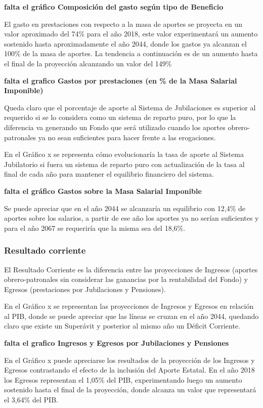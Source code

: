 \documentclass[a4paper,11pt]{article}
\begin{document}
\textbf{falta el gráfico Composición del gasto según tipo de Beneficio}

El gasto en prestaciones con respecto a la masa de aportes se proyecta en un valor aproximado del 74\% para el año 2018, este valor experimentará un aumento sostenido hasta aproximadamente el año 2044, donde los gastos ya alcanzan el 100\% de la masa de aportes.  La tendencia a continuación es de un aumento hasta el final de la proyección alcanzando un valor del 149\%

\textbf{falta el grafico Gastos por prestaciones (en \% de la Masa Salarial Imponible)}

Queda claro que el porcentaje de aporte al Sistema de Jubilaciones es superior al requerido si se lo considera como un sistema de reparto puro, por lo que la diferencia va generando un Fondo que será utilizado cuando los aportes obrero-patronales ya no sean suficientes para hacer frente a las erogaciones.

En el Gráfico x se representa cómo evolucionaría la tasa de aporte al Sistema Jubilatorio si fuera un sistema de reparto puro con actualización de la tasa al final de cada año para mantener el equilibrio financiero del sistema.

\textbf{falta el gráfico Gastos sobre la Masa Salarial Imponible}

Se puede apreciar que en el año 2044 se alcanzaría un equilibrio con 12,4\% de aportes sobre los salarios, a partir de ese año los aportes ya no serían suficientes y para el año 2067 se requeriría que la misma sea del 18,6\%.

\subsubsection{Resultado corriente}

El Resultado Corriente es la diferencia entre las proyecciones de Ingresos (aportes obrero-patronales sin considerar las ganancias por la rentabilidad del Fondo) y Egresos (prestaciones por Jubilaciones y Pensiones).

En el Gráfico x se representan las proyecciones de Ingresos y Egresos en relación al PIB, donde se puede apreciar que las líneas se cruzan en el año 2044, quedando claro que existe un Superávit y posterior al mismo año un Déficit Corriente.

\textbf{falta el grafico Ingresos y Egresos por Jubilaciones y Pensiones}

En el Gráfico x puede apreciarse los resultados de la proyección de los Ingresos y Egresos contrastando el efecto de la inclusión del Aporte Estatal. En el año 2018 los Egresos representan el 1,05\% del PIB, experimentando luego un aumento sostenido hasta el final de la proyección, donde alcanza un valor que representará el 3,64\% del PIB. 
\end{document}
